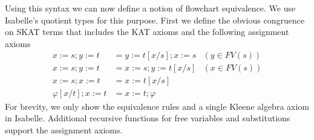 \documentclass{llncs}
\begin{document}
Using this syntax we can now define a notion of flowchart
equivalence. We use Isabelle's quotient types for this purpose. First
we define the obvious congruence on SKAT terms that includes the KAT
axioms and the following assignment axioms
\begin{align*}
x := s; y := t &= y := t[x/s]; x := s &(y \in FV(s))\\
x := s; y := t &= x := s; y := t[x/s] &(x \in FV(s))\\
x := s; x := t &= x := t[x/s]\\
\varphi[x/t]; x := t &= x := t; \varphi
\end{align*}
For brevity, we only show the equivalence rules and a single Kleene
algebra axiom in Isabelle. Additional recursive functions for free
variables and substitutions support the assignment axioms.
\end{document}
